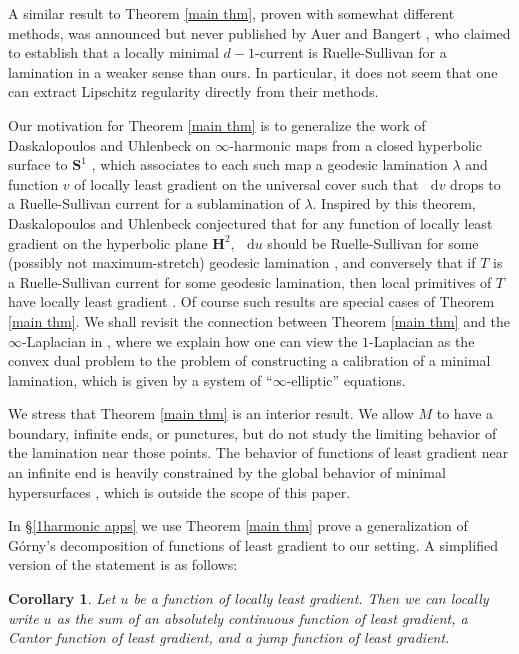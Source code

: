 \documentclass[reqno,11pt]{amsart}
\newcommand{\Hyp}{\mathbf H}
\newcommand{\Sph}{\mathbf S}
\newcommand*\dif{\mathop{}\!\mathrm{d}}
\newtheorem{corollary}[theorem]{Corollary}
\theoremstyle{definition}
\numberwithin{equation}{section}
\begin{document}
A similar result to Theorem \ref{main thm}, proven with somewhat different methods, was announced but never published by Auer and Bangert \cite{Auer01, Auer12}, who claimed to establish that a locally minimal $d - 1$-current is Ruelle-Sullivan for a lamination in a weaker sense than ours.
In particular, it does not seem that one can extract Lipschitz regularity directly from their methods.

Our motivation for Theorem \ref{main thm} is to generalize the work of Daskalopoulos and Uhlenbeck on $\infty$-harmonic maps from a closed hyperbolic surface to $\Sph^1$ \cite{daskalopoulos2020transverse}, which associates to each such map a geodesic lamination $\lambda$ and function $v$ of locally least gradient on the universal cover such that $\dif v$ drops to a Ruelle-Sullivan current for a sublamination of $\lambda$.
Inspired by this theorem, Daskalopoulos and Uhlenbeck conjectured that for any function of locally least gradient on the hyperbolic plane $\Hyp^2$, $\dif u$ should be Ruelle-Sullivan for some (possibly not maximum-stretch) geodesic lamination \cite[Problem 9.4]{daskalopoulos2020transverse}, and conversely that if $T$ is a Ruelle-Sullivan current for some geodesic lamination, then local primitives of $T$ have locally least gradient \cite[Conjecture 9.5]{daskalopoulos2020transverse}.
Of course such results are special cases of Theorem \ref{main thm}.
We shall revisit the connection between Theorem \ref{main thm} and the $\infty$-Laplacian in \cite{BackusInfinityMaxwell1}, where we explain how one can view the $1$-Laplacian as the convex dual problem to the problem of constructing a calibration of a minimal lamination, which is given by a system of ``$\infty$-elliptic'' equations.

We stress that Theorem \ref{main thm} is an interior result.
We allow $M$ to have a boundary, infinite ends, or punctures, but do not study the limiting behavior of the lamination near those points.
The behavior of functions of least gradient near an infinite end is heavily constrained by the global behavior of minimal hypersurfaces \cite[\S4.4]{górny2021}, which is outside the scope of this paper.

In \S\ref{1harmonic apps} we use Theorem \ref{main thm} prove a generalization of G\'orny's decomposition of functions of least gradient \cite[Theorem 1.2]{górny2017planar} to our setting.
A simplified version of the statement is as follows:

\begin{corollary}
Let $u$ be a function of locally least gradient.
Then we can locally write $u$ as the sum of an absolutely continuous function of least gradient, a Cantor function of least gradient, and a jump function of least gradient.
\end{corollary}
\end{document}
